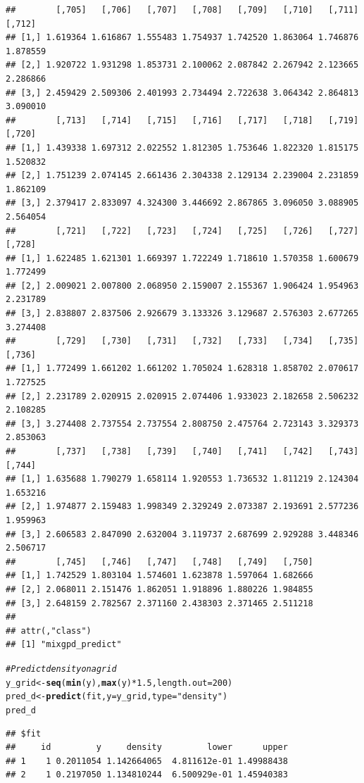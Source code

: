 \documentclass[article]{jss}\usepackage[]{graphicx}\usepackage[]{xcolor}
\makeatletter
\newcommand{\hlnum}[1]{\textcolor[rgb]{0.686,0.059,0.569}{#1}}%
\newcommand{\hlsng}[1]{\textcolor[rgb]{0.192,0.494,0.8}{#1}}%
\newcommand{\hlcom}[1]{\textcolor[rgb]{0.678,0.584,0.686}{\textit{#1}}}%
\newcommand{\hlopt}[1]{\textcolor[rgb]{0,0,0}{#1}}%
\newcommand{\hldef}[1]{\textcolor[rgb]{0.345,0.345,0.345}{#1}}%
\newcommand{\hlkwb}[1]{\textcolor[rgb]{0.69,0.353,0.396}{#1}}%
\newcommand{\hlkwc}[1]{\textcolor[rgb]{0.333,0.667,0.333}{#1}}%
\newcommand{\hlkwd}[1]{\textcolor[rgb]{0.737,0.353,0.396}{\textbf{#1}}}%
\newenvironment{kframe}{%
 \def\at@end@of@kframe{}%
 \ifinner\ifhmode%
  \def\at@end@of@kframe{\end{minipage}}%
  \begin{minipage}{\columnwidth}%
 \fi\fi%
 \def\FrameCommand##1{\hskip\@totalleftmargin \hskip-\fboxsep
 \colorbox{shadecolor}{##1}\hskip-\fboxsep
     \hskip-\linewidth \hskip-\@totalleftmargin \hskip\columnwidth}%
 \MakeFramed {\advance\hsize-\width
   \@totalleftmargin\z@ \linewidth\hsize
   \@setminipage}}%
 {\par\unskip\endMakeFramed%
 \at@end@of@kframe}
\newenvironment{knitrout}{}{} %
\makeatother
\begin{document}
\begin{knitrout}
\begin{kframe}
\begin{verbatim}
##        [,705]   [,706]   [,707]   [,708]   [,709]   [,710]   [,711]   [,712]
## [1,] 1.619364 1.616867 1.555483 1.754937 1.742520 1.863064 1.746876 1.878559
## [2,] 1.920722 1.931298 1.853731 2.100062 2.087842 2.267942 2.123665 2.286866
## [3,] 2.459429 2.509306 2.401993 2.734494 2.722638 3.064342 2.864813 3.090010
##        [,713]   [,714]   [,715]   [,716]   [,717]   [,718]   [,719]   [,720]
## [1,] 1.439338 1.697312 2.022552 1.812305 1.753646 1.822320 1.815175 1.520832
## [2,] 1.751239 2.074145 2.661436 2.304338 2.129134 2.239004 2.231859 1.862109
## [3,] 2.379417 2.833097 4.324300 3.446692 2.867865 3.096050 3.088905 2.564054
##        [,721]   [,722]   [,723]   [,724]   [,725]   [,726]   [,727]   [,728]
## [1,] 1.622485 1.621301 1.669397 1.722249 1.718610 1.570358 1.600679 1.772499
## [2,] 2.009021 2.007800 2.068950 2.159007 2.155367 1.906424 1.954963 2.231789
## [3,] 2.838807 2.837506 2.926679 3.133326 3.129687 2.576303 2.677265 3.274408
##        [,729]   [,730]   [,731]   [,732]   [,733]   [,734]   [,735]   [,736]
## [1,] 1.772499 1.661202 1.661202 1.705024 1.628318 1.858702 2.070617 1.727525
## [2,] 2.231789 2.020915 2.020915 2.074406 1.933023 2.182658 2.506232 2.108285
## [3,] 3.274408 2.737554 2.737554 2.808750 2.475764 2.723143 3.329373 2.853063
##        [,737]   [,738]   [,739]   [,740]   [,741]   [,742]   [,743]   [,744]
## [1,] 1.635688 1.790279 1.658114 1.920553 1.736532 1.811219 2.124304 1.653216
## [2,] 1.974877 2.159483 1.998349 2.329249 2.073387 2.193691 2.577236 1.959963
## [3,] 2.606583 2.847090 2.632004 3.119737 2.687699 2.929288 3.448346 2.506717
##        [,745]   [,746]   [,747]   [,748]   [,749]   [,750]
## [1,] 1.742529 1.803104 1.574601 1.623878 1.597064 1.682666
## [2,] 2.068011 2.151476 1.862051 1.918896 1.880226 1.984855
## [3,] 2.648159 2.782567 2.371160 2.438303 2.371465 2.511218
## 
## attr(,"class")
## [1] "mixgpd_predict"
\end{verbatim}
\begin{alltt}
\hlcom{# Predict density on a grid}
\hldef{y_grid} \hlkwb{<-} \hlkwd{seq}\hldef{(}\hlkwd{min}\hldef{(y),} \hlkwd{max}\hldef{(y)} \hlopt{*} \hlnum{1.5}\hldef{,} \hlkwc{length.out} \hldef{=} \hlnum{200}\hldef{)}
\hldef{pred_d} \hlkwb{<-} \hlkwd{predict}\hldef{(fit,} \hlkwc{y} \hldef{= y_grid,} \hlkwc{type} \hldef{=} \hlsng{"density"}\hldef{)}
\hldef{pred_d}
\end{alltt}
\begin{verbatim}
## $fit
##     id         y     density         lower      upper
## 1    1 0.2011054 1.142664065  4.811612e-01 1.49988438
## 2    1 0.2197050 1.134810244  6.500929e-01 1.45940383

\end{verbatim}
\end{kframe}
\end{knitrout}
\end{document}

